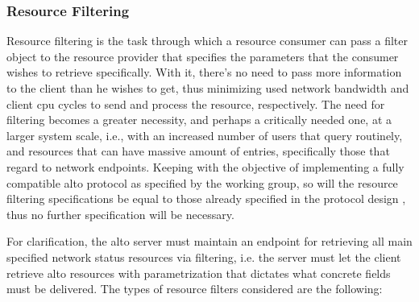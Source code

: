 \subsubsection{Resource Filtering}

    Resource filtering is the task through which a resource consumer can pass a filter object to the resource provider that specifies the parameters that the consumer wishes to retrieve specifically.
    With it, there's no need to pass more information to the client than he wishes to get, thus minimizing used network bandwidth and client \gls{cpu} cycles to send and process the resource, respectively.
    The need for filtering becomes a greater necessity, and perhaps a critically needed one, at a larger system scale, i.e., with an increased number of users that query routinely, and resources that can have massive amount of entries, specifically those that regard to network endpoints.
    Keeping with the objective of implementing a fully compatible \gls{alto} protocol as specified by the working group, so will the resource filtering specifications be equal to those already specified in the protocol design \cite{alto-protocol}, thus no further specification will be necessary.

    For clarification, the \gls{alto} server must maintain an endpoint for retrieving all main specified network status resources via filtering, i.e. the server must let the client retrieve \gls{alto} resources with parametrization that dictates what concrete fields must be delivered.
    The types of resource filters considered are the following:

